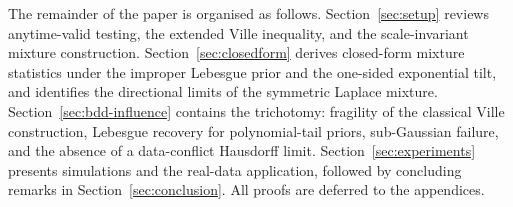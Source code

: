 \documentclass[numsec,webpdf,modern,medium,namedate]{oup-authoring-template}
\theoremstyle{thmstyleone}%
\theoremstyle{thmstyletwo}%
\theoremstyle{thmstylethree}%
\newcommand{\1}{\mathbf{1}}
\begin{document}

 
The remainder of the paper is organised as follows. Section~\ref{sec:setup} reviews anytime-valid testing, the extended Ville inequality, and the scale-invariant mixture construction. Section~\ref{sec:closedform} derives closed-form mixture statistics under the improper Lebesgue prior and the one-sided exponential tilt, and identifies the directional limits of the symmetric Laplace mixture. Section~\ref{sec:bdd-influence} contains the trichotomy: fragility of the classical Ville construction, Lebesgue recovery for polynomial-tail priors, sub-Gaussian failure, and the absence of a data-conflict Hausdorff limit. Section~\ref{sec:experiments} presents simulations and the real-data application, followed by concluding remarks in Section~\ref{sec:conclusion}. All proofs are deferred to the appendices.
\end{document}
